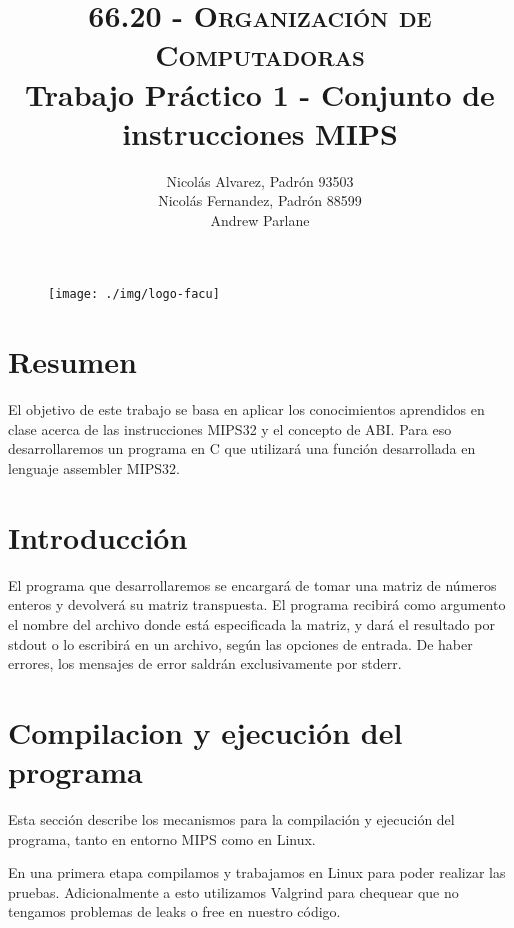 \documentclass[a4paper]{article}
\begin{document}
\begin{figure}
\centering
\texttt{[image: ./img/logo-facu]}
\end{figure}

\title{\large\textsc{66.20 - Organización de Computadoras}\\
\large Trabajo Práctico 1 - Conjunto de instrucciones MIPS}

\author{
Nicolás Alvarez, Padrón 93503\\
Nicolás Fernandez, Padrón 88599\\
Andrew Parlane \hspace{2cm} \\
}

\maketitle

\newpage

\tableofcontents

\newpage

\section{Resumen}
El objetivo de este trabajo se basa en aplicar los conocimientos aprendidos en clase acerca de las instrucciones MIPS32 y el concepto de ABI.  Para eso desarrollaremos un programa en C que utilizará una función desarrollada en lenguaje assembler MIPS32.

\section{Introducción}
El programa que desarrollaremos se encargará de tomar una matriz de números enteros y devolverá su matriz transpuesta. El programa recibirá como argumento el nombre del archivo donde está especificada la matriz, y dará el resultado por stdout o lo escribirá en un archivo, según las opciones de entrada. De haber errores, los mensajes de error saldrán exclusivamente por stderr.

\section{Compilacion y ejecución del programa}
Esta sección describe  los mecanismos para la compilación y ejecución del programa, tanto en entorno MIPS como en Linux.

En una primera etapa compilamos y trabajamos en Linux para poder realizar las pruebas. Adicionalmente a esto utilizamos Valgrind para chequear que no tengamos problemas de leaks o free en nuestro código.\newline
\end{document}
